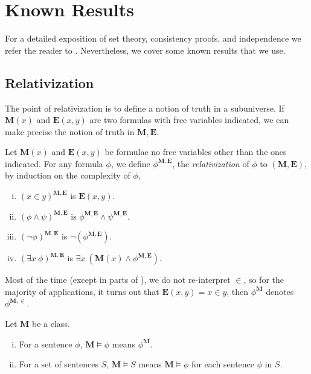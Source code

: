 \section{Known Results}

For a detailed exposition of set theory, consistency proofs, and independence we refer the reader to \autocite{kunen1980}.
Nevertheless, we cover some known results that we use.

\subsection{Relativization}


\newcommand*{\M}{\mathbf{M}}
\newcommand*{\E}{\mathbf{E}}
\renewcommand*{\models}{\vDash}
\newcommand*{\Axiom}[1]{{\normalfont\textsf{#1}}}


The point of relativization is to define a notion of truth in a subuniverse.
If \(\mathbf{M}(x)\) and \(\mathbf{E}(x,y)\) are two formulas with free variables indicated,
we can make precise the notion of truth in \(\mathbf{M},\mathbf{E}\).
\begin{definition}
    Let \(\mathbf{M}(x)\) and \(\mathbf{E}(x,y)\) be formulae no free variables other than the ones indicated.
    For any formula \(\phi\), we define \(\phi^{\mathbf{M},\mathbf{E}}\), the \emph{relativization} of \(\phi\) to \((\M,\E)\),
    by induction on the complexity of \(\phi\),
    \begin{enumerate}[i.]
        \item \((x\in y)^{\M,\E}\) is \(\E(x,y)\).
        \item \((\phi\land\psi)^{\M,\E}\) is \(\phi^{\M,\E}\land\psi^{\M,\E}\).
        \item \((\lnot\phi)^{\M,\E}\) is \(\lnot (\phi^{\M,\E})\).
        \item \((\exists x\ \phi)^{\M,\E}\) is \(\exists x\ (\M(x) \land \phi^{\M,\E})\).
    \end{enumerate}
\end{definition}
\begin{remark}
    Most of the time (except in parts of ), we do not re-interpret \(\in\),
    so for the majority of applications, it turns out that \(\E(x,y) = x\in y\),
    then \(\phi^\M\) denotes \(\phi^{\M,\in}\).
\end{remark}

\begin{definition}
    Let \(\M\) be a class.
    \begin{enumerate}[i.]
        \item For a sentence \(\phi\), \(\M\models\phi\) means \(\phi^\M\).
        \item For a set of sentences \(S\), \(\M\models S\) means \(\M\models\phi\) for each sentence \(\phi\) in \(S\).
    \end{enumerate}
\end{definition}

